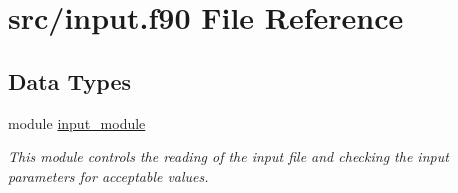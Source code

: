 \hypertarget{input_8f90}{\section{src/input.f90 File Reference}
\label{input_8f90}
}
\subsection*{Data Types}
\begin{DoxyCompactItemize}
\item 
module \hyperlink{classinput__module}{input\-\_\-module}
\begin{DoxyCompactList}\small\item\em This module controls the reading of the input file and checking the input parameters for acceptable values. \end{DoxyCompactList}\end{DoxyCompactItemize}
